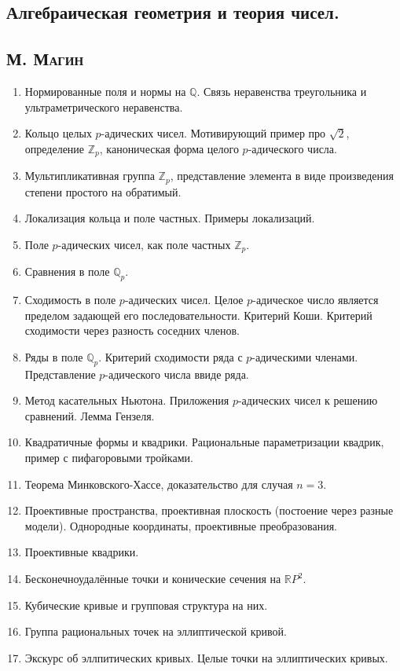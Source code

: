 \documentclass[12pt]{article}
\begin{document}
\begin{center}
    \section*{Алгебраическая геометрия и теория чисел.}
    \subsection*{\textsc{М. Магин}}
\end{center}

\begin{enumerate}
    \item Нормированные поля и нормы на $\mathbb{Q}$. Связь неравенства треугольника и ультраметрического неравенства.
    \item Кольцо целых $p$-адических чисел. Мотивирующий пример про $\sqrt{2}$, определение $\mathbb{Z}_p$, каноническая форма целого $p$-адического числа.
    \item Мультипликативная группа $\mathbb{Z}_p$, представление элемента в виде произведения степени простого на обратимый.
    \item Локализация кольца и поле частных. Примеры локализаций.
    \item Поле $p$-адических чисел, как поле частных $\mathbb{Z}_p$.
    \item Сравнения в поле $\mathbb{Q}_p$.
    \item Сходимость в поле $p$-адических чисел. Целое $p$-адическое число является пределом задающей его последовательности. Критерий Коши. Критерий сходимости через разность соседних членов.
    \item Ряды в поле $\mathbb{Q}_p$. Критерий сходимости ряда с $p$-адическими членами. Представление $p$-адического числа ввиде ряда.
    \item Метод касательных Ньютона. Приложения $p$-адических чисел к решению сравнений. Лемма Гензеля.
    \item Квадратичные формы и квадрики. Рациональные параметризации квадрик, пример с пифагоровыми тройками.
    \item Теорема Минковского-Хассе, доказательство для случая $n = 3$.
    \item Проективные пространства, проективная плоскость (постоение через разные модели). Однородные координаты, проективные преобразования.
    \item Проективные квадрики.
    \item Бесконечноудалённые точки и конические сечения на $\mathbb{R}P^2$.
    \item Кубические кривые и групповая структура на них.
    \item Группа рациональных точек на эллиптической кривой.
    \item Экскурс об эллпитических кривых. Целые точки на эллиптических кривых.
\end{enumerate}
\end{document}
